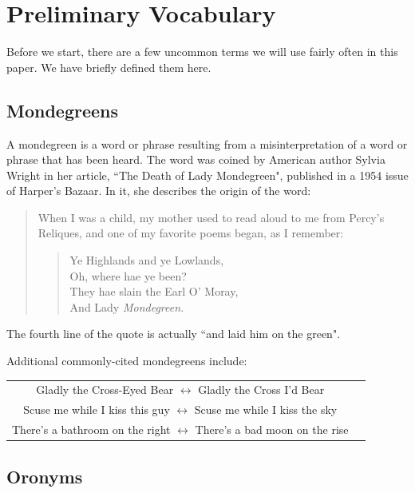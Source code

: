 \chapter{Preliminary Vocabulary}
\label{vocab}

Before we start, there are a few uncommon terms we will use fairly often in this paper. We have briefly defined them here.

\section{Mondegreens}
\label{vocab:mondegreens}

A mondegreen is a word or phrase resulting from a misinterpretation of a word or phrase that has been heard\cite{dictionaryDotComMondegreen}.  The word was coined by American author Sylvia Wright in her article, ``The Death of Lady Mondegreen", published in a 1954 issue of Harper's Bazaar. In it, she describes the origin of the word:
\begin{quote}
When I was a child, my mother used to read aloud to me from Percy's Reliques, and one of my favorite poems began, as I remember:
    \begin{verse}
    Ye Highlands and ye Lowlands, \\
    Oh, where hae ye been? \\
    They hae slain the Earl O' Moray,\\
    And Lady \emph{Mondegreen.}
    \end{verse}

\end{quote} 
The fourth line of the quote is actually ``and laid him on the green"\cite{mondegreenOriginRef}.  

Additional commonly-cited mondegreens include:
\begin{center}
\begin{tabular}{cc}
 Gladly the Cross-Eyed Bear $\leftrightarrow$  Gladly the Cross I'd Bear\cite{gladlyTheCrossRef}  \\
 Scuse me while I kiss this guy $\leftrightarrow$  Scuse me while I kiss the sky \cite{purpleHazeRef} \\
 There's a bathroom on the right $\leftrightarrow$  There's a bad moon on the rise \cite{badMoonRisingRef} \\
\end{tabular}
\end{center}


\section{Oronyms}
\label{vocab:oronyms}

